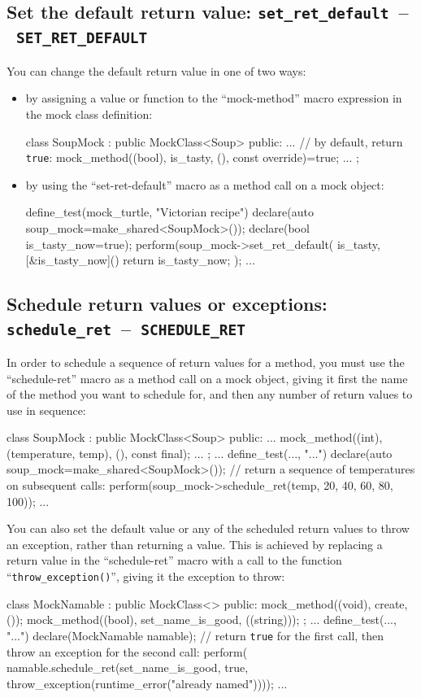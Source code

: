 \documentclass[twoside, a4paper, article]{memoir}
\newcommand*\testudocolor{\color{red!80!blue}}
\newcommand*\testudo[1]{\texttt{\testudocolor{}#1}}
\newcommand*\testudopair[2]{\testudo{#1}~--~\testudo{#2}}
\newcommand\subsectiontestudopair[3]{%
  \subsection[#1]{#1: \testudopair{#2}{#3}}}
\begin{document}
\subsectiontestudopair{Set the default return value}%
  {set\_ret\_default}{SET\_RET\_DEFAULT}

You can change the default return value in one of two ways:
\begin{itemize}
\item by assigning a value or function to the ``mock-method'' macro expression
  in the mock class definition:
\begin{cpplisting}
class SoupMock
  : public MockClass<Soup> {
public:
  ...
  // by default, return \texttt{true}:
  mock_method((bool), is_tasty, (), const override)=true;
  ...
};
\end{cpplisting}
\item by using the ``set-ret-default'' macro as a method call on a mock object:
\begin{cpplisting}
define_test(mock_turtle, "Victorian recipe") {
  declare(auto soup_mock=make_shared<SoupMock>());
  declare(bool is_tasty_now=true);
  perform(soup_mock->set_ret_default(
            is_tasty,
            [&is_tasty_now]() { return is_tasty_now; });
  ...
}
\end{cpplisting}
\end{itemize}

\subsectiontestudopair{Schedule return values or exceptions}%
  {schedule\_ret}{SCHEDULE\_RET}

In order to schedule a sequence of return values for a method, you must use the
``schedule-ret'' macro as a method call on a mock object, giving it first the
name of the method you want to schedule for, and then any number of return
values to use in sequence:
\begin{cpplisting}
class SoupMock
  : public MockClass<Soup> {
public:
  ...
  mock_method((int), (temperature, temp), (), const final);
  ...
};
...
define_test(..., "...") {
  declare(auto soup_mock=make_shared<SoupMock>());
  // return a sequence of temperatures on subsequent calls:
  perform(soup_mock->schedule_ret(temp,
                                  20, 40, 60, 80, 100));
  ...
}
\end{cpplisting}

You can also set the default value or any of the scheduled return values to
throw an exception, rather than returning a value.  This is achieved by
replacing a return value in the ``schedule-ret'' macro with a call to the
function ``\texttt{throw\_exception()}'', giving it the exception to throw:
\begin{cpplisting}
class MockNamable
  : public MockClass<> {
public:
  mock_method((void), create, ());
  mock_method((bool), set_name_is_good, ((string)));
};
...
define_test(..., "...") {
  declare(MockNamable namable);
  // return \texttt{true} for the first call, then throw an exception for the %
     second call:
  perform(
    namable.schedule_ret(set_name_is_good,
      true,
      throw_exception(runtime_error("already named"))));
  ...
}
\end{cpplisting}
\end{document}
